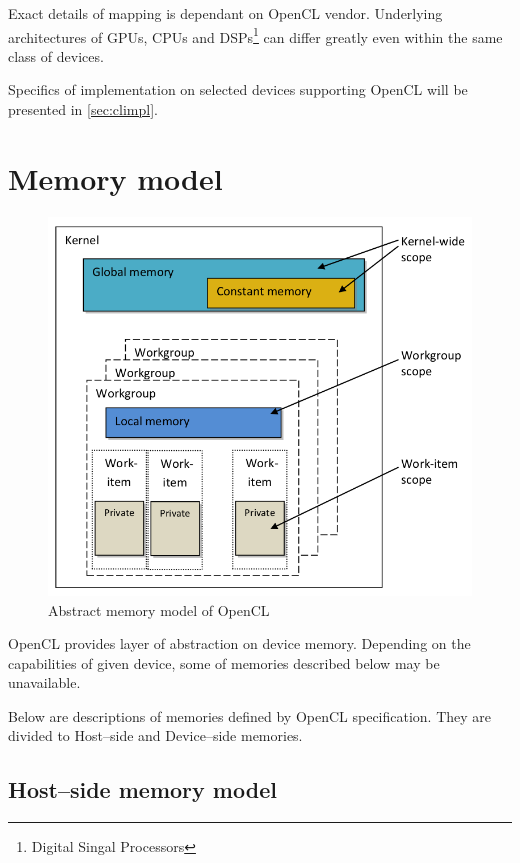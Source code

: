 Exact details of mapping is dependant on OpenCL vendor. Underlying architectures
of GPUs, CPUs and DSPs\footnote{Digital Singal Processors} can differ greatly
even within the same class of devices.

Specifics of implementation on selected devices supporting OpenCL will be
presented in \autoref{sec:climpl}.

\section{Memory model}

\begin{figure}[htpb]
  \begin{center}
    \includegraphics[width=\textwidth]{chapters/opencl/memory.png}
  \end{center}
  \caption{Abstract memory model of OpenCL \parencite{gaster2012heterogeneous}}
  \label{fig:clmemmodel}
\end{figure}

OpenCL provides layer of abstraction on device memory. Depending on the
capabilities of given device, some of memories described below may be
unavailable.

Below are descriptions of memories defined by OpenCL specification. They are
divided to Host--side and Device--side memories.

\subsection{Host--side memory model}

